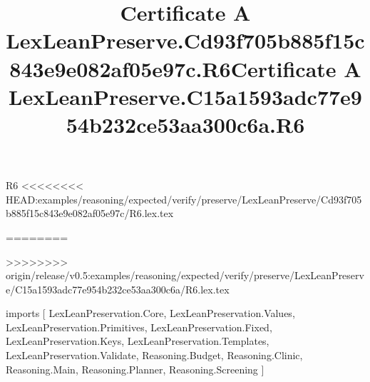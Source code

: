\begin{lexlean}{R6}
<<<<<<<< HEAD:examples/reasoning/expected/verify/preserve/LexLeanPreserve/Cd93f705b885f15c843e9e082af05e97c/R6.lex.tex
\title{Certificate A LexLeanPreserve.Cd93f705b885f15c843e9e082af05e97c.R6}
========
\title{Certificate A LexLeanPreserve.C15a1593adc77e954b232ce53aa300c6a.R6}
>>>>>>>> origin/release/v0.5:examples/reasoning/expected/verify/preserve/LexLeanPreserve/C15a1593adc77e954b232ce53aa300c6a/R6.lex.tex
\begin{coremodule}
imports [
  LexLeanPreservation.Core,
  LexLeanPreservation.Values,
  LexLeanPreservation.Primitives,
  LexLeanPreservation.Fixed,
  LexLeanPreservation.Keys,
  LexLeanPreservation.Templates,
  LexLeanPreservation.Validate,
  Reasoning.Budget,
  Reasoning.Clinic,
  Reasoning.Main,
  Reasoning.Planner,
  Reasoning.Screening
]


\end{coremodule}
\end{lexlean}
